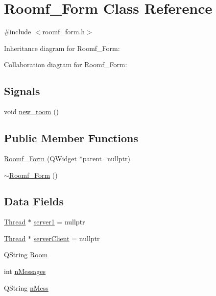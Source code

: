 \hypertarget{class_roomf___form}{}\section{Roomf\+\_\+\+Form Class Reference}
\label{class_roomf___form}


{\ttfamily \#include $<$roomf\+\_\+form.\+h$>$}



Inheritance diagram for Roomf\+\_\+\+Form\+:


Collaboration diagram for Roomf\+\_\+\+Form\+:
\subsection*{Signals}
\begin{DoxyCompactItemize}
\item 
void \mbox{\hyperlink{class_roomf___form_ad98e88a294513f6f8c5380174e738086}{new\+\_\+room}} ()
\end{DoxyCompactItemize}
\subsection*{Public Member Functions}
\begin{DoxyCompactItemize}
\item 
\mbox{\hyperlink{class_roomf___form_a50b6e25ac826e207e769f762d5d6a54c}{Roomf\+\_\+\+Form}} (Q\+Widget $\ast$parent=nullptr)
\item 
\mbox{\hyperlink{class_roomf___form_a375bc7ad1d62106b65d32760d73af1ad}{$\sim$\+Roomf\+\_\+\+Form}} ()
\end{DoxyCompactItemize}
\subsection*{Data Fields}
\begin{DoxyCompactItemize}
\item 
\mbox{\hyperlink{class_thread}{Thread}} $\ast$ \mbox{\hyperlink{class_roomf___form_a45dc0c008f3a55cef83302046c1ece47}{server1}} = nullptr
\item 
\mbox{\hyperlink{class_thread}{Thread}} $\ast$ \mbox{\hyperlink{class_roomf___form_aeec51e8ae8159d701ea689ace5c45f06}{server\+Client}} = nullptr
\item 
Q\+String \mbox{\hyperlink{class_roomf___form_a19fcb5c555424b65791ad288225c47c4}{Room}}
\item 
int \mbox{\hyperlink{class_roomf___form_a1d86ac7246859ec80dc24d141bb9c1c7}{n\+Messages}}
\item 
Q\+String \mbox{\hyperlink{class_roomf___form_aa3b0040875c0743836134fbc61ee4ddd}{n\+Mess}}
\end{DoxyCompactItemize}
